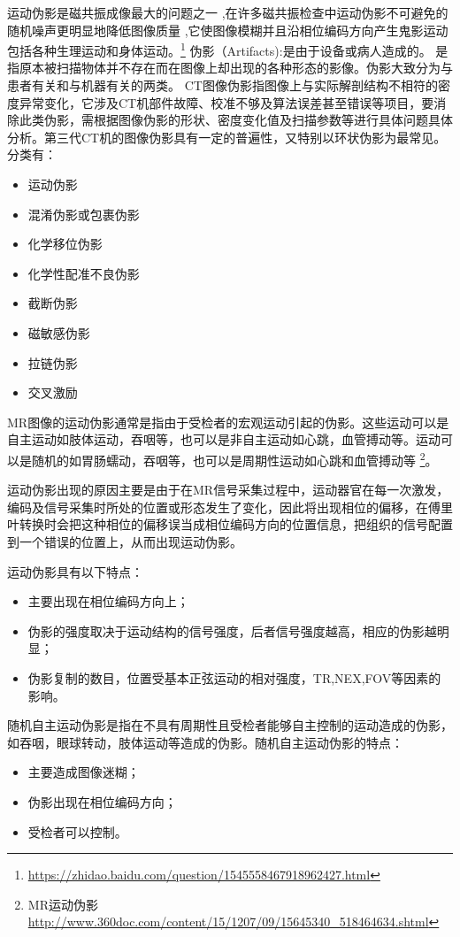 运动伪影是磁共振成像最大的问题之一 ,在许多磁共振检查中运动伪影不可避免的随机噪声更明显地降低图像质量 ,它使图像模糊并且沿相位编码方向产生鬼影运动包括各种生理运动和身体运动。\footnote{\url{https://zhidao.baidu.com/question/1545558467918962427.html}}
伪影（Artifacts):是由于设备或病人造成的。
是指原本被扫描物体并不存在而在图像上却出现的各种形态的影像。伪影大致分为与患者有关和与机器有关的两类。
CT图像伪影指图像上与实际解剖结构不相符的密度异常变化，它涉及CT机部件故障、校准不够及算法误差甚至错误等项目，要消除此类伪影，需根据图像伪影的形状、密度变化值及扫描参数等进行具体问题具体分析。第三代CT机的图像伪影具有一定的普遍性，又特别以环状伪影为最常见。
分类有：
\begin{itemize}
    \item 运动伪影
    \item 混淆伪影或包裹伪影
    \item 化学移位伪影
    \item 化学性配准不良伪影
    \item 截断伪影
    \item 磁敏感伪影
    \item 拉链伪影
    \item 交叉激励
\end{itemize}

MR图像的运动伪影通常是指由于受检者的宏观运动引起的伪影。这些运动可以是自主运动如肢体运动，吞咽等，也可以是非自主运动如心跳，血管搏动等。运动可以是随机的如胃肠蠕动，吞咽等，也可以是周期性运动如心跳和血管搏动等
\footnote{MR运动伪影 \quad \url{http://www.360doc.com/content/15/1207/09/15645340_518464634.shtml}}。

运动伪影出现的原因主要是由于在MR信号采集过程中，运动器官在每一次激发，编码及信号采集时所处的位置或形态发生了变化，因此将出现相位的偏移，在傅里叶转换时会把这种相位的偏移误当成相位编码方向的位置信息，把组织的信号配置到一个错误的位置上，从而出现运动伪影。

运动伪影具有以下特点：
\begin{itemize}
    \item 主要出现在相位编码方向上；
    \item 伪影的强度取决于运动结构的信号强度，后者信号强度越高，相应的伪影越明显；
    \item 伪影复制的数目，位置受基本正弦运动的相对强度，TR,NEX,FOV等因素的影响。
\end{itemize}

随机自主运动伪影是指在不具有周期性且受检者能够自主控制的运动造成的伪影，如吞咽，眼球转动，肢体运动等造成的伪影。随机自主运动伪影的特点：
\begin{itemize}
    \item 主要造成图像迷糊；
    \item 伪影出现在相位编码方向；
    \item 受检者可以控制。
\end{itemize}

